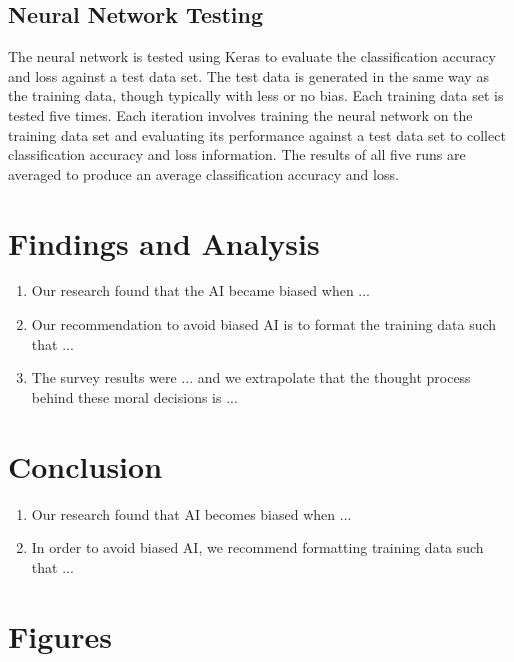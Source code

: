 \documentclass{report}
\begin{document}
\section{Neural Network Testing}

The neural network is tested using Keras to evaluate the classification accuracy and loss against a
test data set. The test data is generated in the same way as the training data, though typically
with less or no bias. Each training data set is tested five times. Each iteration involves training
the neural network on the training data set and evaluating its performance against a test data set
to collect classification accuracy and loss information. The results of all five runs are averaged
to produce an average classification accuracy and loss.

\chapter{Findings and Analysis}

\begin{enumerate}
    \item Our research found that the AI became biased when ...
    
    \item Our recommendation to avoid biased AI is to format the training data such that ...
    
    \item The survey results were ... and we extrapolate that the thought process behind these moral
    decisions is ...
\end{enumerate}

\chapter{Conclusion}

\begin{enumerate}
    \item Our research found that AI becomes biased when ...
    
    \item In order to avoid biased AI, we recommend formatting training data such that ...
\end{enumerate}




\appendix
\chapter{Figures}
\end{document}
